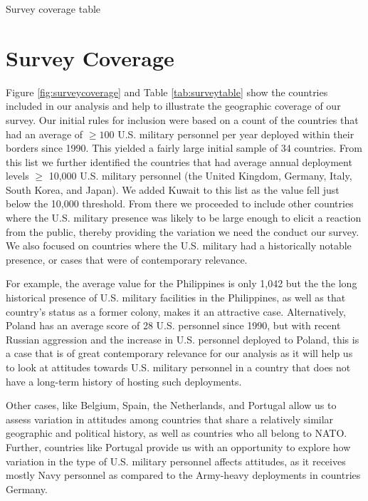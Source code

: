 \documentclass[12pt]{article}
\begin{document}
\begin{table}[h]
     \begin{center}
          \caption{Survey coverage table}
          \label{tab:surveytable}
          
     \end{center}
\end{table}

\section{Survey Coverage}

Figure \ref{fig:surveycoverage} and Table \ref{tab:surveytable} show the countries included in our analysis and help to illustrate the geographic coverage of our survey. Our initial rules for inclusion were based on a count of the countries that had an average of $\geq100$ U.S. military personnel per year deployed within their borders since 1990. This yielded a fairly large initial sample of 34 countries. From this list we further identified the countries that had average annual deployment levels $\geq$ 10,000 U.S. military personnel (the United Kingdom, Germany, Italy, South Korea, and Japan). We added Kuwait to this list as the value fell just below the 10,000 threshold. From there we proceeded to include other countries where the U.S. military presence was likely to be large enough to elicit a reaction from the public, thereby providing the variation we need the conduct our survey. We also focused on countries where the U.S. military had a historically notable presence, or cases that were of contemporary relevance. 

For example, the average value for the Philippines is only 1,042 but the the long historical presence of U.S. military facilities in the Philippines, as well as that country's status as a former colony, makes it an attractive case. Alternatively,  Poland has an average score of 28 U.S. personnel since 1990, but with recent Russian aggression and the increase in U.S. personnel deployed to Poland, this is a case that is of great contemporary relevance for our analysis as it will help us to look at attitudes towards U.S. military personnel in a country that does not have a long-term history of hosting such deployments. 

Other cases, like Belgium, Spain, the Netherlands, and Portugal allow us to assess variation in attitudes among countries that share a relatively similar geographic and political history, as well as countries who all belong to NATO. Further, countries like Portugal provide us with an opportunity to explore how variation in the type of U.S. military personnel affects attitudes, as it receives mostly Navy personnel as compared to the Army-heavy deployments in countries Germany. 
\end{document}
